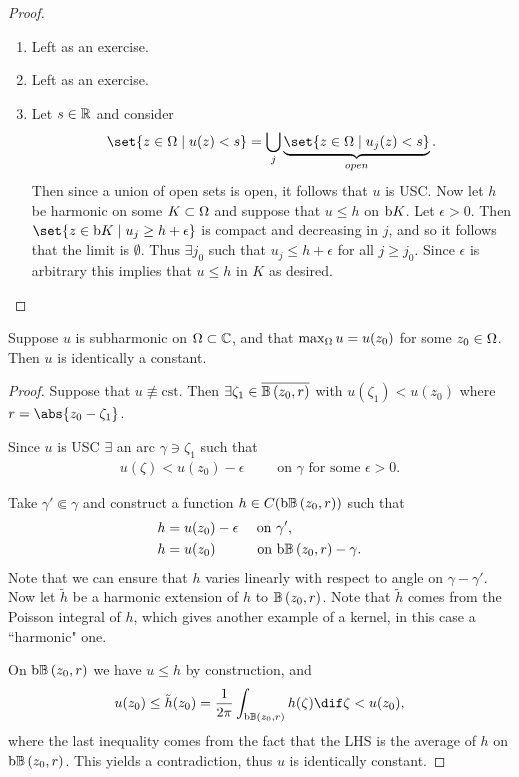 \begin{proof}
    \phantom{.}
    \begin{enumerate}
        \item Left as an exercise.
        \item Left as an exercise.
        \item Let $s \in \mathbb{R}$ and consider
        \begin{align*}
            \set{z \in \om \mid u(z) < s} = \bigcup_{j} \underbrace{\set{z \in \om \mid u_j(z) < s}}_{open}.
        \end{align*}
        Then since a union of open sets is open, it follows that $u$ is USC. Now let $h$ be harmonic on some $K \subset \Omega$ and suppose that $u \leq h$ on $\operatorname{b}\! K$. Let $\epsilon > 0$. Then $\set{z \in \bdy K \mid u_j \geq h + \epsilon}$ is compact and decreasing in $j$, and so it follows that the limit is $\emptyset$. Thus $\exists j_0 $ such that $u_j \leq h+\epsilon$ for all $j \geq j_0$. Since $\epsilon$ is arbitrary this implies that $u \leq h$ in $K$ as desired.
    \end{enumerate}
\end{proof}

\begin{theorem}
    Suppose $u$ is subharmonic on $\Omega \subset \mathbb{C}$, and that $\max_{\Omega} u = u(z_0)$ for some $z_0 \in \Omega$. Then $u$ is identically a constant.
\end{theorem}

\begin{proof}
    Suppose that $u \not\equiv \text{cst}$. Then $\exists \zeta_1 \in \ov{\ball{z_0}{r}}$ with $u(\zeta_1) < u(z_0)$ where $r = \abs{z_0 - \zeta_1}$.

    Since $u $ is USC $\exists$ an arc $\gamma \ni \zeta_1$ such that
    \begin{align*}
        u(\zeta) < u(z_0) - \epsilon \qquad \text{ on $\gamma$ for some $\epsilon >0$}. 
    \end{align*}

    Take $\gamma' \Subset \gamma$ and construct a function $h \in C(\bdy \ball{z_0}{r})$ such that
    \begin{align*}
        h &= u(z_0) - \epsilon \quad \text{ on $\gamma'$},\\
        h &= u(z_0) \! \! \quad\qquad \text{ on $\bdy \ball{z_0}{r} - \gamma$}.
    \end{align*}
    Note that we can ensure that $h$ varies linearly with respect to angle on $\gamma - \gamma'$. Now let $\tilde{h}$ be a harmonic extension of $h$ to $\ball{z_0}{r}$. Note that $\tilde{h}$ comes from the Poisson integral of $h$, which gives another example of a kernel, in this case a ``harmonic" one.

    On $\bdy \ball{z_0}{r}$ we have $u \leq h$ by construction, and
    \begin{align*}
        u(z_0) \leq \tilde{h}(z_0) = \frac{1}{2 \pi} \int_{\bdy \ball{z_0}{r}} h(\zeta) \dif \zeta < u(z_0),
    \end{align*}
    where the last inequality comes from the fact that the LHS is the average of $h$ on $\bdy \ball{z_0}{r}$. This yields a contradiction, thus $u$ is identically constant.
\end{proof}


